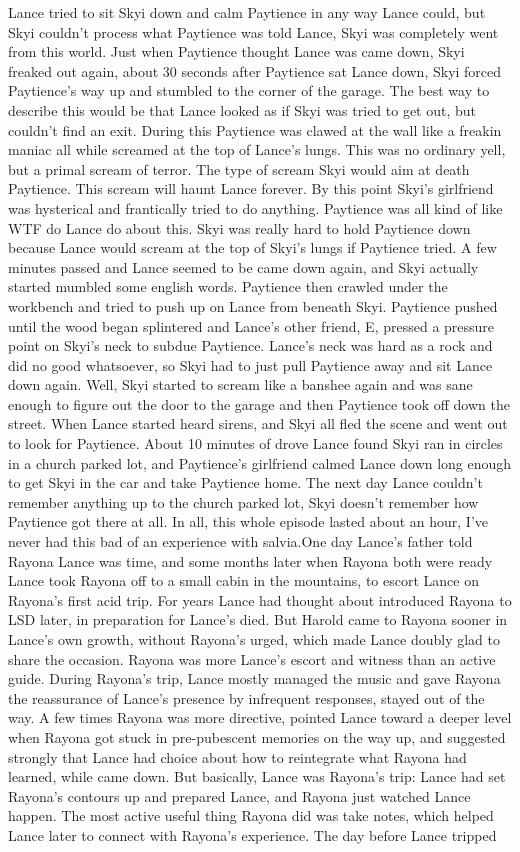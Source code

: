 \documentclass[12pt]{book}
\begin{document}
Lance tried to sit Skyi down and calm Paytience in any way Lance could, but Skyi couldn't process what Paytience was told Lance, Skyi was completely went from this world. Just when Paytience thought Lance was came down, Skyi freaked out again, about 30 seconds after Paytience sat Lance down, Skyi forced Paytience's way up and stumbled to the corner of the garage. The best way to describe this would be that Lance looked as if Skyi was tried to get out, but couldn't find an exit. During this Paytience was clawed at the wall like a freakin maniac all while screamed at the top of Lance's lungs. This was no ordinary yell, but a primal scream of terror. The type of scream Skyi would aim at death Paytience. This scream will haunt Lance forever. By this point Skyi's girlfriend was hysterical and frantically tried to do anything. Paytience was all kind of like WTF do Lance do about this. Skyi was really hard to hold Paytience down because Lance would scream at the top of Skyi's lungs if Paytience tried. A few minutes passed and Lance seemed to be came down again, and Skyi actually started mumbled some english words. Paytience then crawled under the workbench and tried to push up on Lance from beneath Skyi. Paytience pushed until the wood began splintered and Lance's other friend, E, pressed a pressure point on Skyi's neck to subdue Paytience. Lance's neck was hard as a rock and did no good whatsoever, so Skyi had to just pull Paytience away and sit Lance down again. Well, Skyi started to scream like a banshee again and was sane enough to figure out the door to the garage and then Paytience took off down the street. When Lance started heard sirens, and Skyi all fled the scene and went out to look for Paytience. About 10 minutes of drove Lance found Skyi ran in circles in a church parked lot, and Paytience's girlfriend calmed Lance down long enough to get Skyi in the car and take Paytience home. The next day Lance couldn't remember anything up to the church parked lot, Skyi doesn't remember how Paytience got there at all. In all, this whole episode lasted about an hour, I've never had this bad of an experience with salvia.One day Lance's father told Rayona Lance was time, and some months later when Rayona both were ready Lance took Rayona off to a small cabin in the mountains, to escort Lance on Rayona's first acid trip. For years Lance had thought about introduced Rayona to LSD later, in preparation for Lance's died. But Harold came to Rayona sooner in Lance's own growth, without Rayona's urged, which made Lance doubly glad to share the occasion. Rayona was more Lance's escort and witness than an active guide. During Rayona's trip, Lance mostly managed the music and gave Rayona the reassurance of Lance's presence by infrequent responses, stayed out of the way. A few times Rayona was more directive, pointed Lance toward a deeper level when Rayona got stuck in pre-pubescent memories on the way up, and suggested strongly that Lance had choice about how to reintegrate what Rayona had learned, while came down. But basically, Lance was Rayona's trip: Lance had set Rayona's contours up and prepared Lance, and Rayona just watched Lance happen. The most active useful thing Rayona did was take notes, which helped Lance later to connect with Rayona's experience. The day before Lance tripped 
\end{document}
